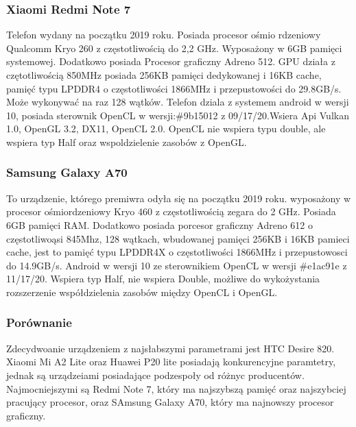 \subsubsection[Xiaomi Redmi Note 7]{Xiaomi Redmi Note 7}
Telefon wydany na początku 2019 roku. Posiada procesor ośmio rdzeniowy Qualcomm Kryo 260 z częstotliwością do 2,2 GHz. Wyposażony w 6GB pamięci systemowej. Dodatkowo posiada Procesor graficzny Adreno 512. GPU działa z czętotliwością 850MHz posiada 256KB pamięci dedykowanej i 16KB cache, pamięć typu LPDDR4 o częstotliwości 1866MHz i przepustowości do 29.8GB/s. Może wykonywać na raz 128 wątków. Telefon dziala z systemem android w wersji 10, posiada sterownik OpenCL w wersji:\#9b15012 z 09/17/20.Wsiera Api Vulkan 1.0, OpenGL 3.2, DX11, OpenCL 2.0. OpenCL nie wspiera typu double, ale wspiera typ Half oraz wspoldzielenie zasobów z OpenGL.
\subsubsection[Samsung Galaxy A70]{Samsung Galaxy A70}
To urządzenie, którego premiwra odyła się na początku 2019 roku. wyposażony w procesor ośmiordzeniowy Kryo 460 z częstotliwością zegara do 2 GHz. Posiada 6GB pamięci RAM. Dodatkowo posiada porcesor graficzny Adreno 612 o częstotliwoąsi 845Mhz, 128 wątkach, wbudowanej pamięci 256KB i 16KB pamieci cache, jest to pamięć typu LPDDR4X o częstotliwości 1866MHz i przepustowosci do 14.9GB/s. Android w wersji 10 ze sterownikiem OpenCL w wersji \#e1ac91e z 11/17/20. Wspiera typ Half, nie wspiera Double, możliwe do wykożystania rozszerzenie współdzielenia zasobów między OpenCL i OpenGL.
\subsubsection[Porównanie]{Porównanie}
Zdecydwoanie urządzeniem z najsłabszymi parametrami jest HTC Desire 820. Xiaomi Mi A2 Lite oraz Huawei P20 lite posiadają konkurencyjne paramtetry, jednak są urządzeiami posiadające podzespoły od różnyc producentów. Najmocniejszymi są Redmi Note 7, który ma najszybszą pamięć oraz najszybciej pracujący procesor, oraz SAmsung Galaxy A70, który ma najnowszy procesor graficzny.
